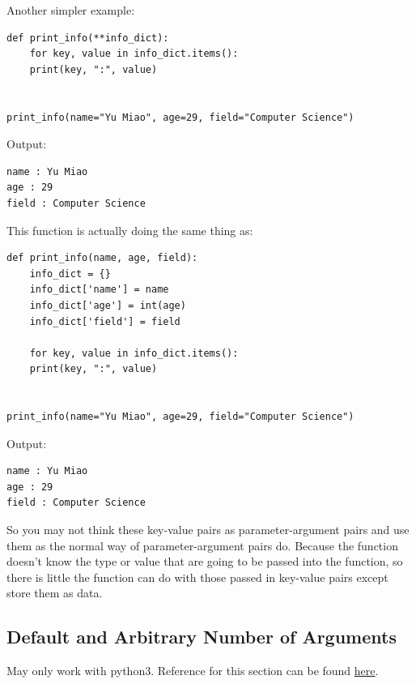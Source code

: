 \documentclass[12pt]{book}
\begin{document}
Another simpler example:
\begin{verbatim}
def print_info(**info_dict):
    for key, value in info_dict.items():
	print(key, ":", value)


print_info(name="Yu Miao", age=29, field="Computer Science")
\end{verbatim}
Output:
\begin{verbatim}
name : Yu Miao
age : 29
field : Computer Science
\end{verbatim}
This function is actually doing the same thing as:
\begin{verbatim}
def print_info(name, age, field):
    info_dict = {}
    info_dict['name'] = name
    info_dict['age'] = int(age)
    info_dict['field'] = field

    for key, value in info_dict.items():
	print(key, ":", value)


print_info(name="Yu Miao", age=29, field="Computer Science")
\end{verbatim}
Output:
\begin{verbatim}
name : Yu Miao
age : 29
field : Computer Science
\end{verbatim}

So you may not think these key-value pairs as parameter-argument pairs and use them as the normal way of parameter-argument pairs do. Because the function doesn't know the type or value that are going to be passed into the function, so there is little the function can do with those passed in key-value pairs except store them as data.

\subsection{Default and Arbitrary Number of Arguments}
\label{sec:org10ce71f}
May only work with python3. Reference for this section can be found \href{https://stackoverflow.com/questions/46446960/how-to-use-default-values-and-arbitrary-arguments-at-one-function-call-in-python}{here}.
\end{document}
